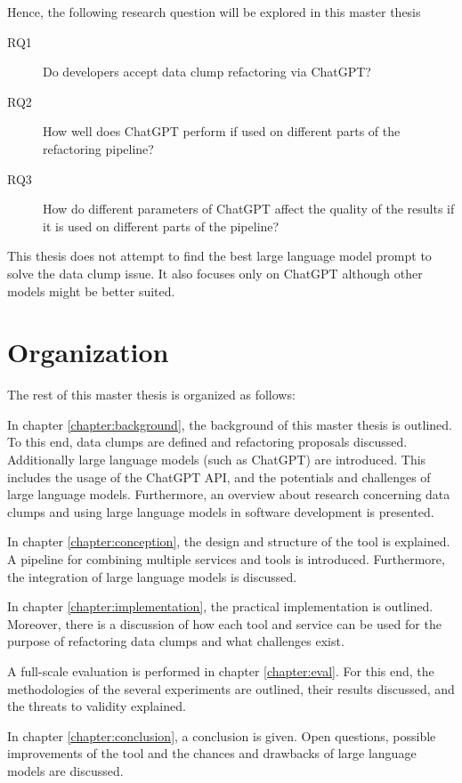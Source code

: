 Hence, the following research question will be explored in this master thesis

\begin{description}
    \item [RQ1] Do developers accept data clump refactoring via ChatGPT?
    \item [RQ2] How well does ChatGPT perform if used on different parts of the refactoring pipeline?
    \item [RQ3] How do different parameters of ChatGPT affect the quality of the results if it is used on different parts of the pipeline?
\end{description}
This thesis does not attempt to find the best large language model prompt to solve the data clump issue. It also focuses only on ChatGPT although other models might be better suited. 
\section{Organization}
The rest of this master thesis is organized as follows:

In chapter \ref{chapter:background}, the background of this master thesis  is outlined. To this end, data clumps are defined and refactoring proposals discussed. Additionally large language models (such as ChatGPT) are introduced. This includes the usage of the ChatGPT \ac{API}, and the potentials and challenges of large language models.  Furthermore, an overview about research  concerning data clumps and using large language models in software development is presented. 

In chapter \ref{chapter:conception}, the design and structure of the tool is explained. A pipeline for combining multiple services and tools is introduced. Furthermore, the integration of large language models is discussed. 

In chapter \ref{chapter:implementation}, the practical implementation is outlined.  Moreover, there is a discussion of how each tool and service can be used for the purpose of refactoring data clumps and what challenges exist. 

A full-scale evaluation is performed in chapter \ref{chapter:eval}. For this end, the methodologies of the several experiments  are outlined, their results discussed, and the threats to validity explained. 

In chapter \ref{chapter:conclusion}, a conclusion is given. Open questions, possible improvements of the tool and the chances and drawbacks of large language models are discussed.